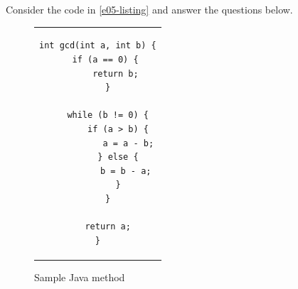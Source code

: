 \documentclass [11pt, a4wide, twoside]{article}
\begin{document}
\newpage

Consider the code in \autoref{e05-listing} and answer the questions below.

\begin{figure}[thp]
\centering
\begin{tabular}{c}
\definecolor{violet}{RGB}{255,0,0}
\lstset{language=}
\begin{lstlisting}
int gcd(int a, int b) {
	if (a == 0) { 
		return b; 
	}
	
	while (b != 0) {
		if (a > b) {
			a = a - b;
		} else {
			b = b - a; 
	 	}
	}
	
	return a;
}
\end{lstlisting}
\end{tabular}
\vspace{-0.4cm}
\caption{Sample Java method}
\label{e05-listing}
\end{figure}
\end{document}
